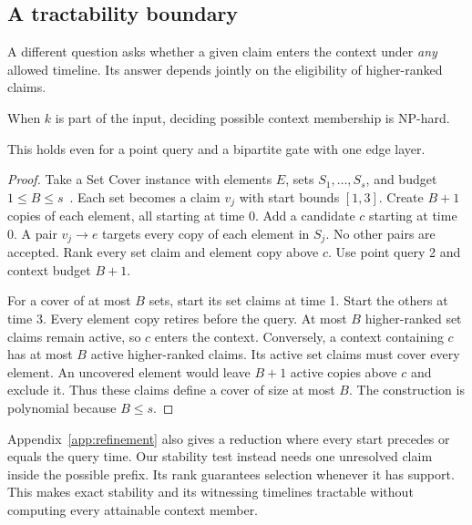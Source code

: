 \subsection{A tractability boundary}
A different question asks whether a given claim enters the context under \emph{any} allowed timeline.
Its answer depends jointly on the eligibility of higher-ranked claims.
\begin{theorem}
\label{thm:hardness}
When $k$ is part of the input, deciding possible context membership is NP-hard.
\end{theorem}
This holds even for a point query and a bipartite gate with one edge layer.
\begin{proof}
Take a Set Cover instance with elements $E$, sets $S_1,\ldots,S_s$, and budget $1\le B\le s$~\citep{karp1972reducibility}.
Each set becomes a claim $v_j$ with start bounds $[1,3]$.
Create $B+1$ copies of each element, all starting at time 0.
Add a candidate $c$ starting at time 0.
A pair $v_j\to e$ targets every copy of each element in $S_j$.
No other pairs are accepted.
Rank every set claim and element copy above $c$.
Use point query 2 and context budget $B+1$.

For a cover of at most $B$ sets, start its set claims at time 1.
Start the others at time 3.
Every element copy retires before the query.
At most $B$ higher-ranked set claims remain active, so $c$ enters the context.
Conversely, a context containing $c$ has at most $B$ active higher-ranked claims.
Its active set claims must cover every element.
An uncovered element would leave $B+1$ active copies above $c$ and exclude it.
Thus these claims define a cover of size at most $B$.
The construction is polynomial because $B\le s$.
\end{proof}
Appendix~\ref{app:refinement} also gives a reduction where every start precedes or equals the query time.
Our stability test instead needs one unresolved claim inside the possible prefix.
Its rank guarantees selection whenever it has support.
This makes exact stability and its witnessing timelines tractable without computing every attainable context member.
